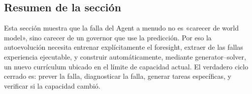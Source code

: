 

\subsection{Resumen de la sección}

Esta sección muestra que la falla del Agent a menudo no es «carecer de world model», sino carecer de un governor que use la predicción. Por eso la autoevolución necesita entrenar explícitamente el foresight, extraer de las fallas experiencia ejecutable, y construir automáticamente, mediante generator--solver, un nuevo currículum ubicado en el límite de capacidad actual. El verdadero ciclo cerrado es: prever la falla, diagnosticar la falla, generar tareas específicas, y verificar si la capacidad cambió.

